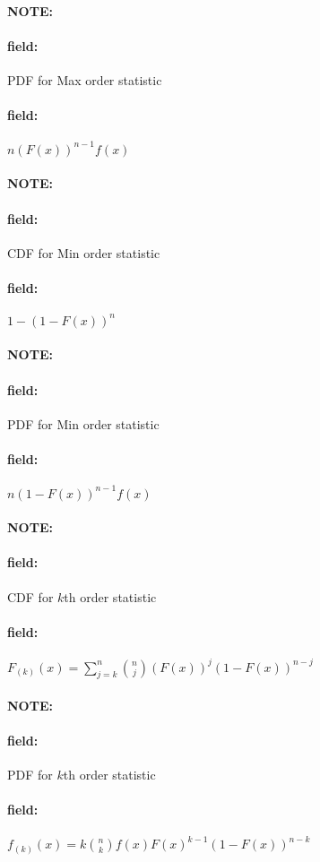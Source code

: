 \documentclass[12pt]{article}
\newenvironment{note}{\paragraph{NOTE:}}{}
\newenvironment{field}{\paragraph{field:}}{}
\begin{document}
\begin{note}
  \begin{field}
    PDF for Max order statistic
  \end{field}
  \begin{field}
    $n(F(x))^{n-1}f(x)$
  \end{field}
\end{note}

\begin{note}
  \begin{field}
    CDF for Min order statistic
  \end{field}
  \begin{field}
    $1 - (1 - F(x))^n$
  \end{field}
\end{note}

\begin{note}
  \begin{field}
    PDF for Min order statistic
  \end{field}
  \begin{field}
    $n(1 - F(x))^{n-1}f(x)$
  \end{field}
\end{note}

\begin{note}
  \begin{field}
    CDF for $k$th order statistic
  \end{field}
  \begin{field}
    $F_{(k)}(x) = \sum_{j = k}^n \binom{n}{j}(F(x))^j(1 -F(x))^{n-j}$
  \end{field}
\end{note}

\begin{note}
  \begin{field}
    PDF for $k$th order statistic
  \end{field}
  \begin{field}
    $f_{(k)}(x) = k \binom{n}{k}f(x)F(x)^{k-1}(1 - F(x))^{n-k}$
  \end{field}
\end{note}


\end{document}
